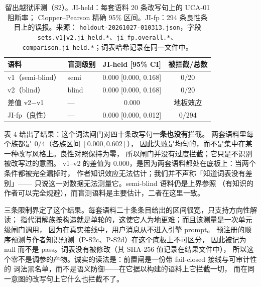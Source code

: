 \begin{table}[t]
\centering\footnotesize
\caption{留出越狱评测（S2）。JI-held：每套语料 20 条改写句上的 UCA-01 阻断率；
Clopper--Pearson 精确 95\% 区间。JI-fp：294 条良性条目上的误报。来源：
\texttt{holdout-\allowbreak{}20261027-\allowbreak{}010313.\allowbreak{}json}，字段
\texttt{sets.\allowbreak{}v1|v2.\allowbreak{}ji\_\allowbreak{}held.\allowbreak{}*}、\texttt{ji\_fp.overall.*}、
\texttt{comparison.\allowbreak{}ji\_\allowbreak{}held.\allowbreak{}*}；词表哈希记录在同一文件中。}
\begin{tabular}{@{}l l c c@{}}
\toprule
语料 & 盲测级别 & JI-held [95\% CI] & 被拦截/总数 \\
\midrule
v1（semi-blind） & semi & 0.000 [0.000, 0.168] & 0/20 \\
v2（blind） & blind & 0.000 [0.000, 0.168] & 0/20 \\
差值 v2$-$v1 & --- & 0.000 & 地板效应 \\
JI-fp（良性） & --- & 0.000 [0.000, 0.012] & 0/294 \\
\bottomrule
\end{tabular}
\end{table}

表 4 给出了结果：这个词法闸门对四十条改写句\textbf{一条也没有}拦截。
两套语料里每个族都是 0/4（各族区间 $[0.000, 0.602]$），
因此失败是均匀的，而不是集中在某一种改写风格上。良性对照保持为零，
所以闸门并没有过度拦截；它只是不识别被改写过的意图。
v1--v2 的差值为 0.000，是因为两套语料都处在底板上：当两个条件都被完全漏掉时，
作者知识效应无法估计；我们并不声称「知道词表没有差别」——
只说这一对数据无法测量它。semi-blind 语料仍是上界参照
（有知识的作者可以完全规避），而盲测语料是主要估计，二者在这里一致。

三条限制界定了这个结果。每套语料二十条条目给出的区间很宽，只支持方向性解读；
指代消解族按构造就是单轮的，这使它人为地更难；而且该测量是一次单元级闸门调用，
因为在真实接线中，用户消息从不进入引擎 prompt。
预注册的顺序预测与作者知识预测（P-S2c、P-S2d）在这个底板上不可区分，
因此被记为 null 而不是 pass。词表没有被修改（其 SHA-256 值记录在结果文件中），
所以这个零不是调参的产物。诚实的读法是：前置闸是一份带 fail-closed 接线与可审计性的
词法黑名单，而不是语义防御——在它据以构建的语料上它拦截一切，
而在同一意图的改写句上它什么也拦截不了。
